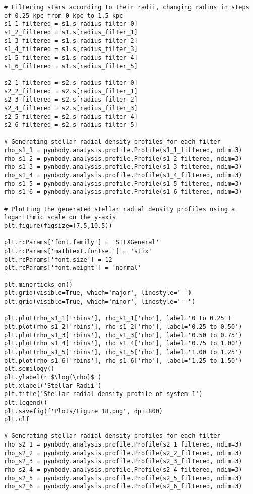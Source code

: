 \documentclass[12pt, a4paper]{article}
\begin{document}
\begin{lstlisting}[language=iPython]
# Filtering stars according to their radii, changing radius in steps of 0.25 kpc from 0 kpc to 1.5 kpc
s1_1_filtered = s1.s[radius_filter_0]
s1_2_filtered = s1.s[radius_filter_1]
s1_3_filtered = s1.s[radius_filter_2]
s1_4_filtered = s1.s[radius_filter_3]
s1_5_filtered = s1.s[radius_filter_4]
s1_6_filtered = s1.s[radius_filter_5]

s2_1_filtered = s2.s[radius_filter_0]
s2_2_filtered = s2.s[radius_filter_1]
s2_3_filtered = s2.s[radius_filter_2]
s2_4_filtered = s2.s[radius_filter_3]
s2_5_filtered = s2.s[radius_filter_4]
s2_6_filtered = s2.s[radius_filter_5]

# Generating stellar radial density profiles for each filter
rho_s1_1 = pynbody.analysis.profile.Profile(s1_1_filtered, ndim=3)
rho_s1_2 = pynbody.analysis.profile.Profile(s1_2_filtered, ndim=3)
rho_s1_3 = pynbody.analysis.profile.Profile(s1_3_filtered, ndim=3)
rho_s1_4 = pynbody.analysis.profile.Profile(s1_4_filtered, ndim=3)
rho_s1_5 = pynbody.analysis.profile.Profile(s1_5_filtered, ndim=3)
rho_s1_6 = pynbody.analysis.profile.Profile(s1_6_filtered, ndim=3)

# Plotting the generated stellar radial density profiles using a logarithmic scale on the y-axis
plt.figure(figsize=(7.5,10.5))

plt.rcParams['font.family'] = 'STIXGeneral'
plt.rcParams['mathtext.fontset'] = 'stix'
plt.rcParams['font.size'] = 12
plt.rcParams['font.weight'] = 'normal'

plt.minorticks_on()
plt.grid(visible=True, which='major', linestyle='-')
plt.grid(visible=True, which='minor', linestyle='--')

plt.plot(rho_s1_1['rbins'], rho_s1_1['rho'], label='0 to 0.25') 
plt.plot(rho_s1_2['rbins'], rho_s1_2['rho'], label='0.25 to 0.50')
plt.plot(rho_s1_3['rbins'], rho_s1_3['rho'], label='0.50 to 0.75')
plt.plot(rho_s1_4['rbins'], rho_s1_4['rho'], label='0.75 to 1.00')
plt.plot(rho_s1_5['rbins'], rho_s1_5['rho'], label='1.00 to 1.25')
plt.plot(rho_s1_6['rbins'], rho_s1_6['rho'], label='1.25 to 1.50')
plt.semilogy()
plt.ylabel(r'$\log{\rho}$')
plt.xlabel('Stellar Radii')
plt.title('Stellar radial density profile of system 1')
plt.legend()
plt.savefig(f'Plots/Figure 18.png', dpi=800)
plt.clf

# Generating stellar radial density profiles for each filter
rho_s2_1 = pynbody.analysis.profile.Profile(s2_1_filtered, ndim=3)
rho_s2_2 = pynbody.analysis.profile.Profile(s2_2_filtered, ndim=3)
rho_s2_3 = pynbody.analysis.profile.Profile(s2_3_filtered, ndim=3)
rho_s2_4 = pynbody.analysis.profile.Profile(s2_4_filtered, ndim=3)
rho_s2_5 = pynbody.analysis.profile.Profile(s2_5_filtered, ndim=3)
rho_s2_6 = pynbody.analysis.profile.Profile(s2_6_filtered, ndim=3)


\end{lstlisting}
\end{document}
